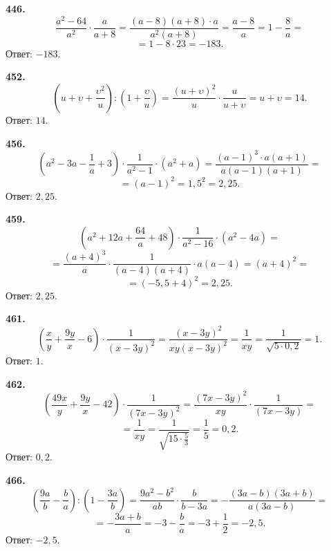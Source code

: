 \newpage\textbf{446.} $$\frac{a^2-64}{a^2}\cdot\frac{a}{a+8}=\frac{\left(a-8\right)\left(a+8\right)\cdot a}{a^2\left(a+8\right)}=\frac{a-8}{a}=1-\frac{8}{a}=$$ $$=1-8\cdot23=-183.$$ \newline \null \hspace*{\fill} Ответ: $-183$. 

\textbf{452.} $$\left(u+\upsilon+\frac{\upsilon^2}{u}\right):\left(1+\frac{\upsilon}{u}\right)=\frac{\left(u+\upsilon\right)^2}{u}\cdot\frac{u}{u+\upsilon}=u+\upsilon=14.$$ \newline \null \hspace*{\fill} Ответ: $14$. 

\textbf{456.} $$\left(a^2-3a-\frac{1}{a}+3\right)\cdot\frac{1}{a^2-1}\cdot\left(a^2+a\right)=\frac{\left(a-1\right)^3\cdot a\left(a+1\right)}{a\left(a-1\right)\left(a+1\right)}=$$ $$=\left(a-1\right)^2=1,5^2=2,25.$$ \newline \null \hspace*{\fill} Ответ: $2,25$.

\textbf{459.} $$\left(a^2+12a+\frac{64}{a}+48\right)\cdot\frac{1}{a^2-16}\cdot\left(a^2-4a\right)=$$ $$=\frac{\left(a+4\right)^3}{a}\cdot\frac{1}{\left(a-4\right)\left(a+4\right)}\cdot a\left(a-4\right)=\left(a+4\right)^2=$$ $$=\left(-5,5+4\right)^2=2,25.$$ \newline \null \hspace*{\fill} Ответ: $2,25$.

\textbf{461.} $$\left(\frac{x}{y}+\frac{9y}{x}-6\right)\cdot\frac{1}{\left(x-3y\right)^2}=\frac{\left(x-3y\right)^2}{xy\left(x-3y\right)^2}=\frac{1}{xy}=\frac{1}{\sqrt{5\cdot0,2}}=1.$$ \newline \null \hspace*{\fill} Ответ: $1$. 

\textbf{462.} $$\left(\frac{49x}{y}+\frac{9y}{x}-42\right)\cdot\frac{1}{\left(7x-3y\right)^2}=\frac{\left(7x-3y\right)^2}{xy}\cdot\frac{1}{\left(7x-3y\right)}=$$ $$=\frac{1}{xy}=\frac{1}{\sqrt{15\cdot\frac{5}{3}}}=\frac{1}{5}=0,2.$$ \newline \null \hspace*{\fill} Ответ: $0,2$.

\textbf{466.} $$\left(\frac{9a}{b}-\frac{b}{a}\right):\left(1-\frac{3a}{b}\right)=\frac{9a^2-b^2}{ab}\cdot\frac{b}{b-3a}=-\frac{\left(3a-b\right)\left(3a+b\right)}{a\left(3a-b\right)}=$$ $$=-\frac{3a+b}{a}=-3-\frac{b}{a}=-3+\frac{1}{2}=-2,5.$$ \newline \null \hspace*{\fill} Ответ: $-2,5$.

